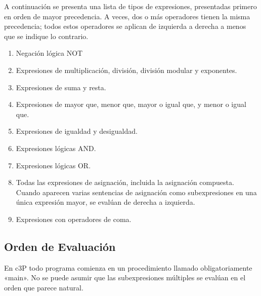 A continuación se presenta una lista de tipos de expresiones, presentadas primero en orden de mayor precedencia. A veces, dos o
más operadores tienen la misma precedencia; todos estos operadores se aplican de izquierda a derecha a menos que se indique lo contrario.

\begin{enumerate}
  \item Negación lógica NOT
  \item Expresiones de multiplicación, división, división modular y exponentes.
  \item Expresiones de suma y resta.
  \item Expresiones de mayor que, menor que, mayor o igual que, y menor o igual que.
  \item Expresiones de igualdad y desigualdad.
  \item Expresiones lógicas AND.
  \item Expresiones lógicas OR.
  \item Todas las expresiones de asignación, incluida la asignación compuesta.
  \newline Cuando aparecen varias sentencias de asignación como subexpresiones en una única expresión mayor, se evalúan de derecha a izquierda.
  \item Expresiones con operadores de coma.
\end{enumerate}

\subsection{Orden de Evaluación}

En c3P todo programa comienza en un procedimiento llamado obligatoriamente «main».
No se puede asumir que las subexpresiones múltiples se evalúan en el orden que parece natural.
